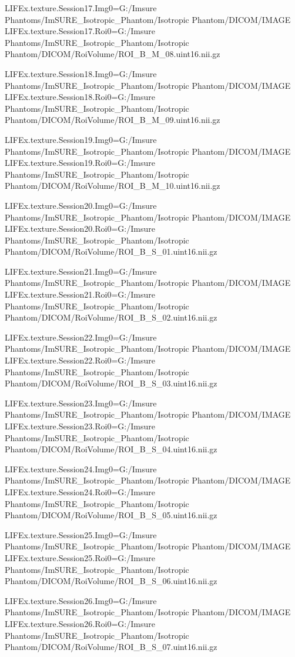 LIFEx.texture.Session17.Img0=G:/Imsure Phantoms/ImSURE_Isotropic_Phantom/Isotropic Phantom/DICOM/IMAGE
LIFEx.texture.Session17.Roi0=G:/Imsure Phantoms/ImSURE_Isotropic_Phantom/Isotropic Phantom/DICOM/RoiVolume/ROI_B_M_08.uint16.nii.gz

LIFEx.texture.Session18.Img0=G:/Imsure Phantoms/ImSURE_Isotropic_Phantom/Isotropic Phantom/DICOM/IMAGE
LIFEx.texture.Session18.Roi0=G:/Imsure Phantoms/ImSURE_Isotropic_Phantom/Isotropic Phantom/DICOM/RoiVolume/ROI_B_M_09.uint16.nii.gz

LIFEx.texture.Session19.Img0=G:/Imsure Phantoms/ImSURE_Isotropic_Phantom/Isotropic Phantom/DICOM/IMAGE
LIFEx.texture.Session19.Roi0=G:/Imsure Phantoms/ImSURE_Isotropic_Phantom/Isotropic Phantom/DICOM/RoiVolume/ROI_B_M_10.uint16.nii.gz

LIFEx.texture.Session20.Img0=G:/Imsure Phantoms/ImSURE_Isotropic_Phantom/Isotropic Phantom/DICOM/IMAGE
LIFEx.texture.Session20.Roi0=G:/Imsure Phantoms/ImSURE_Isotropic_Phantom/Isotropic Phantom/DICOM/RoiVolume/ROI_B_S_01.uint16.nii.gz

LIFEx.texture.Session21.Img0=G:/Imsure Phantoms/ImSURE_Isotropic_Phantom/Isotropic Phantom/DICOM/IMAGE
LIFEx.texture.Session21.Roi0=G:/Imsure Phantoms/ImSURE_Isotropic_Phantom/Isotropic Phantom/DICOM/RoiVolume/ROI_B_S_02.uint16.nii.gz

LIFEx.texture.Session22.Img0=G:/Imsure Phantoms/ImSURE_Isotropic_Phantom/Isotropic Phantom/DICOM/IMAGE
LIFEx.texture.Session22.Roi0=G:/Imsure Phantoms/ImSURE_Isotropic_Phantom/Isotropic Phantom/DICOM/RoiVolume/ROI_B_S_03.uint16.nii.gz

LIFEx.texture.Session23.Img0=G:/Imsure Phantoms/ImSURE_Isotropic_Phantom/Isotropic Phantom/DICOM/IMAGE
LIFEx.texture.Session23.Roi0=G:/Imsure Phantoms/ImSURE_Isotropic_Phantom/Isotropic Phantom/DICOM/RoiVolume/ROI_B_S_04.uint16.nii.gz

LIFEx.texture.Session24.Img0=G:/Imsure Phantoms/ImSURE_Isotropic_Phantom/Isotropic Phantom/DICOM/IMAGE
LIFEx.texture.Session24.Roi0=G:/Imsure Phantoms/ImSURE_Isotropic_Phantom/Isotropic Phantom/DICOM/RoiVolume/ROI_B_S_05.uint16.nii.gz

LIFEx.texture.Session25.Img0=G:/Imsure Phantoms/ImSURE_Isotropic_Phantom/Isotropic Phantom/DICOM/IMAGE
LIFEx.texture.Session25.Roi0=G:/Imsure Phantoms/ImSURE_Isotropic_Phantom/Isotropic Phantom/DICOM/RoiVolume/ROI_B_S_06.uint16.nii.gz

LIFEx.texture.Session26.Img0=G:/Imsure Phantoms/ImSURE_Isotropic_Phantom/Isotropic Phantom/DICOM/IMAGE
LIFEx.texture.Session26.Roi0=G:/Imsure Phantoms/ImSURE_Isotropic_Phantom/Isotropic Phantom/DICOM/RoiVolume/ROI_B_S_07.uint16.nii.gz

